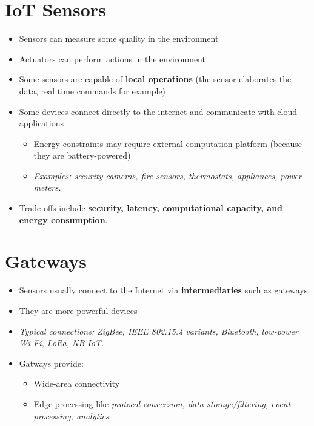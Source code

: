 \documentclass[a4paper, 12pt]{book} %
\begin{document}
\chapter{IoT Sensors}\label{iot-sensors}

\begin{itemize}
\tightlist
\item
  Sensors can measure some quality in the environment
\item
  Actuators can perform actions in the environment
\item
  Some sensors are capable of \textbf{local operations} (the sensor
  elaborates the data, real time commands for example)
\item
  Some devices connect directly to the internet and communicate with
  cloud applications

  \begin{itemize}
  \tightlist
  \item
    Energy constraints may require external computation platform
    (because they are battery-powered)
  \item
    \emph{Examples: security cameras, fire sensors, thermostats,
    appliances, power meters.}
  \end{itemize}
\item
  Trade-offs include \textbf{security, latency, computational capacity,
  and energy consumption}.
\end{itemize}

\chapter{Gateways}\label{gateways}

\begin{itemize}
\tightlist
\item
  Sensors usually connect to the Internet via \textbf{intermediaries}
  such as gateways.
\item
  They are more powerful devices
\item
  \emph{Typical connections: ZigBee, IEEE 802.15.4 variants, Bluetooth,
  low-power Wi-Fi, LoRa, NB-IoT.}
\item
  Gatways provide:

  \begin{itemize}
  \tightlist
  \item
    Wide-area connectivity
  \item
    Edge processing like \emph{protocol conversion, data
    storage/filtering, event processing, analytics}
  \end{itemize}
\end{itemize}
\end{document}
